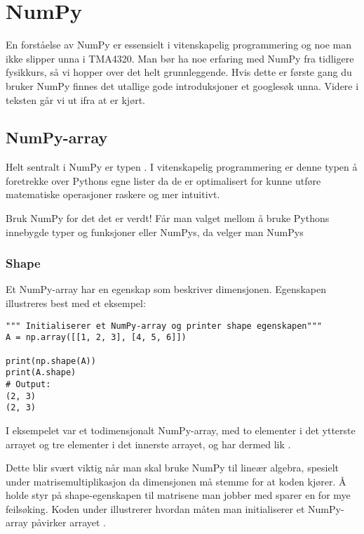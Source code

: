 \documentclass[a4paper,12pt]{article}
\begin{document}
\section{NumPy}
En forståelse av NumPy er essensielt i vitenskapelig programmering og noe man ikke slipper unna i TMA4320. Man bør ha noe erfaring med NumPy fra tidligere fysikkurs, så vi hopper over det helt grunnleggende. Hvis dette er første gang du bruker NumPy finnes det utallige gode introduksjoner et googlesøk unna. Videre i teksten går vi ut ifra at  er kjørt.

\subsection{NumPy-array}
Helt sentralt i NumPy er typen . I vitenskapelig programmering er denne typen å foretrekke over Pythons egne lister da de er optimalisert for kunne utføre matematiske operasjoner raskere og mer intuitivt. 

\begin{mdframed}[frametitle={Tips!}]
Bruk NumPy for det det er verdt! Får man valget mellom å bruke Pythons innebygde typer og funksjoner eller NumPys, da velger man NumPys
\end{mdframed}


\subsubsection{Shape}
Et NumPy-array har en egenskap  som beskriver dimensjonen. Egenskapen illustreres best med et eksempel:

\begin{lstlisting}
""" Initialiserer et NumPy-array og printer shape egenskapen"""
A = np.array([[1, 2, 3], [4, 5, 6]])

print(np.shape(A))
print(A.shape)
# Output:
(2, 3)
(2, 3) 
\end{lstlisting}

I eksempelet var  et todimensjonalt NumPy-array, med to elementer i det ytterste arrayet og tre elementer i det innerste arrayet, og har dermed  lik . 

    Dette blir svært viktig når man skal bruke NumPy til lineær algebra, spesielt under matrisemultiplikasjon da dimensjonen må stemme for at koden kjører. Å holde styr på shape-egenskapen til matrisene man jobber med sparer en for mye feilsøking. Koden under illustrerer hvordan måten man initialiserer et NumPy-array påvirker arrayet .
\end{document}

